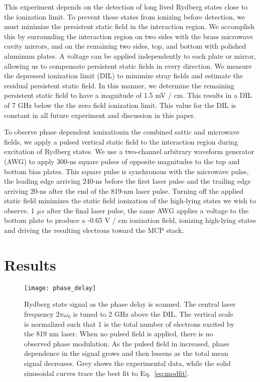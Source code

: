 \documentclass[aps,pra,preprint,groupedaddress]{revtex4-1}
\begin{document}
This experiment depends on the detection of long lived Rydberg states close to the ionization limit. To prevent these states from ionizing before detection, we must minimize the persistent static field in the interaction region. We accomplish this by surrounding the interaction region on two sides with the brass microwave cavity mirrors, and on the remaining two sides, top, and bottom with polished aluminum plates. A voltage can be applied independently to each plate or mirror, allowing us to compensate persistent static fields in every direction. We measure the depressed ionization limit (DIL) to minimize stray fields and estimate the residual persistent static field. In this manner, we determine the remaining persistent static field to have a magnitude of 1.5 mV / cm. This results in a DIL of 7 GHz below the the zero field ionization limit. This value for the DIL is constant in all future experiment and discussion in this paper.

To observe phase dependent ionizationin the combined sattic and microwave fields, we apply a pulsed vertical static field to the interaction region during excitation of Rydberg states. We use a two-channel arbitrary waveform generator (AWG) to apply 300-ns square pulses of opposite magnitudes to the top and bottom bias plates. This square pulse is synchronous with the microwave pulse, the leading edge arriving 240-ns before the first laser pulse and the trailing edge arriving 20-ns after the end of the 819-nm laser pulse. Turning off the applied static field minimizes the static field ionization of the high-lying states we wish to observe. 1 $\mu s$ after the final laser pulse, the same AWG applies a voltage to the bottom plate to produce a -0.65 V / cm ionization field, ionizing high-lying states and driving the resulting electrons toward the MCP stack.

\section{\label{results} Results}

\begin{figure}
	\texttt{[image: phase\_delay]}
	\caption{Rydberg state signal as the phase delay is scanned. The central laser frequency $2\pi\omega_0$ is tuned to 2 GHz above the DIL. The vertical scale is normalized such that 1 is the total number of electrons excited by the 819 nm laser. When no pulsed field is applied, there is no observed phase modulation. As the pulsed field in increased,  phase dependence in the signal grows and then lessens as the total mean signal decreases. Grey shows the experimental data, while the solid sinusoidal curves trace the best fit to Eq.~\ref{eq:modfit}.}
	\label{fig:phase_delay}
\end{figure}
\end{document}
